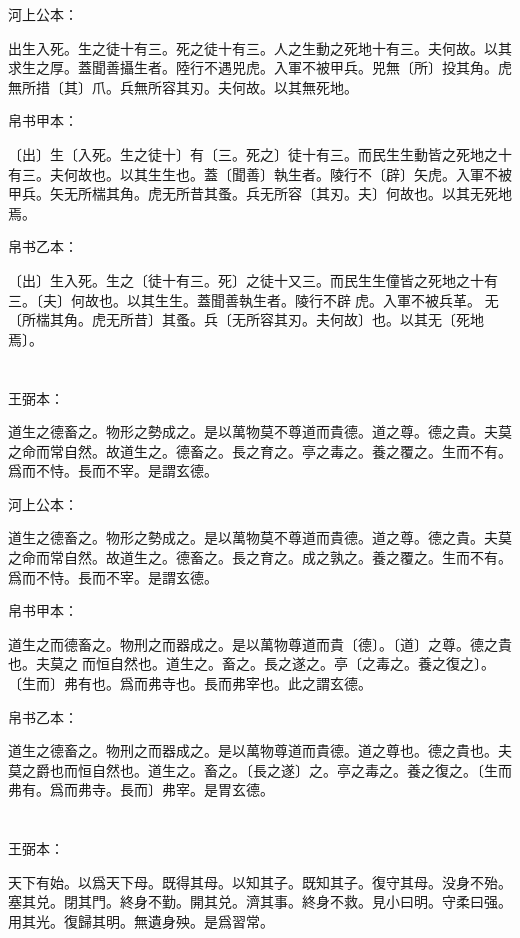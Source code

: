 \documentclass[a5paper]{ctexbook}
\begin{document}
    河上公本：

    出生入死。生之徒十有三。死之徒十有三。人之生動之死地十有三。夫何故。以其求生之厚。蓋聞善攝生者。陸行不遇兕虎。入軍不被甲兵。兕無〔所〕投其角。虎無所措〔其〕爪。兵無所容其刃。夫何故。以其無死地。

    帛书甲本：

    〔出〕生〔入死。生之徒十〕有〔三。死之〕徒十有三。而民生生動皆之死地之十有三。夫何故也。以其生生也。蓋〔聞善〕執生者。陵行不〔辟〕矢虎。入軍不被甲兵。矢无所椯其角。虎无所昔其蚤。兵无所容〔其刃。夫〕何故也。以其无死地焉。

    帛书乙本：

    〔出〕生入死。生之〔徒十有三。死〕之徒十又三。而民生生僮皆之死地之十有三。〔夫〕何故也。以其生生。蓋聞善執生者。陵行不辟𧰽虎。入軍不被兵革。𧰽无〔所椯其角。虎无所昔〕其蚤。兵〔无所容其刃。夫何故〕也。以其无〔死地焉〕。

    \chapter{}
    王弼本：

    道生之德畜之。物形之勢成之。是以萬物莫不尊道而貴德。道之尊。德之貴。夫莫之命而常自然。故道生之。德畜之。長之育之。亭之毒之。養之覆之。生而不有。爲而不恃。長而不宰。是謂玄德。

    河上公本：

    道生之德畜之。物形之勢成之。是以萬物莫不尊道而貴德。道之尊。德之貴。夫莫之命而常自然。故道生之。德畜之。長之育之。成之孰之。養之覆之。生而不有。爲而不恃。長而不宰。是謂玄德。

    帛书甲本：

    道生之而德畜之。物刑之而器成之。是以萬物尊道而貴〔德〕。〔道〕之尊。德之貴也。夫莫之𡬠而恒自然也。道生之。畜之。長之遂之。亭〔之毒之。養之復之〕。〔生而〕弗有也。爲而弗寺也。長而弗宰也。此之謂玄德。

    帛书乙本：

    道生之德畜之。物刑之而器成之。是以萬物尊道而貴德。道之尊也。德之貴也。夫莫之爵也而恒自然也。道生之。畜之。〔長之遂〕之。亭之毒之。養之復之。〔生而弗有。爲而弗寺。長而〕弗宰。是胃玄德。

    \chapter{}
    王弼本：

    天下有始。以爲天下母。既得其母。以知其子。既知其子。復守其母。没身不殆。塞其兑。閉其門。終身不勤。開其兑。濟其事。終身不救。見小曰明。守柔曰强。用其光。復歸其明。無遺身殃。是爲習常。
\end{document}
